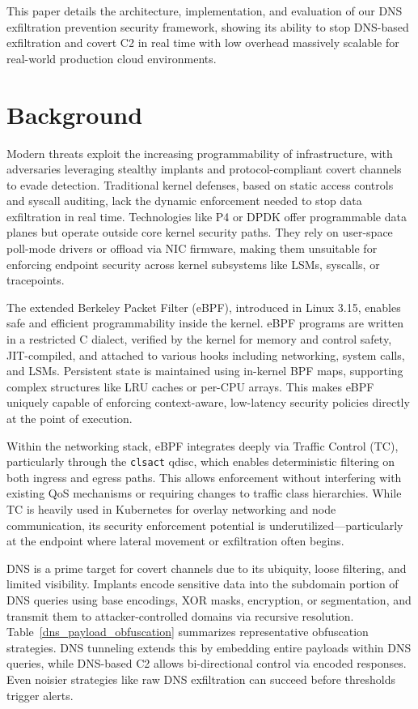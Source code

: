 \documentclass[letterpaper,twocolumn,10pt]{article}
\begin{document}
This paper details the architecture, implementation, and evaluation of our DNS exfiltration prevention security framework, showing its ability to stop DNS-based exfiltration and covert C2 in real time with low overhead massively scalable for real-world production cloud environments.


\section{Background}
\label{sec:background}

Modern threats exploit the increasing programmability of infrastructure, with adversaries leveraging stealthy implants and protocol-compliant covert channels to evade detection. Traditional kernel defenses, based on static access controls and syscall auditing, lack the dynamic enforcement needed to stop data exfiltration in real time. Technologies like P4 or DPDK offer programmable data planes but operate outside core kernel security paths. They rely on user-space poll-mode drivers or offload via NIC firmware, making them unsuitable for enforcing endpoint security across kernel subsystems like LSMs, syscalls, or tracepoints.

The extended Berkeley Packet Filter (eBPF), introduced in Linux 3.15, enables safe and efficient programmability inside the kernel. eBPF programs are written in a restricted C dialect, verified by the kernel for memory and control safety, JIT-compiled, and attached to various hooks including networking, system calls, and LSMs. Persistent state is maintained using in-kernel BPF maps, supporting complex structures like LRU caches or per-CPU arrays. This makes eBPF uniquely capable of enforcing context-aware, low-latency security policies directly at the point of execution.

Within the networking stack, eBPF integrates deeply via Traffic Control (TC), particularly through the \texttt{clsact} qdisc, which enables deterministic filtering on both ingress and egress paths. This allows enforcement without interfering with existing QoS mechanisms or requiring changes to traffic class hierarchies. While TC is heavily used in Kubernetes for overlay networking and node communication, its security enforcement potential is underutilized—particularly at the endpoint where lateral movement or exfiltration often begins.

DNS is a prime target for covert channels due to its ubiquity, loose filtering, and limited visibility. Implants encode sensitive data into the subdomain portion of DNS queries using base encodings, XOR masks, encryption, or segmentation, and transmit them to attacker-controlled domains via recursive resolution. Table~\ref{dns_payload_obfuscation} summarizes representative obfuscation strategies. DNS tunneling extends this by embedding entire payloads within DNS queries, while DNS-based C2 allows bi-directional control via encoded responses. Even noisier strategies like raw DNS exfiltration can succeed before thresholds trigger alerts.
\end{document}
